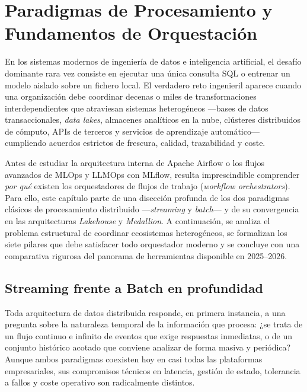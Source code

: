 
\chapter{Paradigmas de Procesamiento y Fundamentos de Orquestación}\label{chap:fundamentos}

En los sistemas modernos de ingeniería de datos e inteligencia artificial, el desafío dominante rara vez consiste en ejecutar una única consulta SQL o entrenar un modelo aislado sobre un fichero local. El verdadero reto ingenieril aparece cuando una organización debe coordinar decenas o miles de transformaciones interdependientes que atraviesan sistemas heterogéneos ---bases de datos transaccionales, \textit{data lakes}, almacenes analíticos en la nube, clústeres distribuidos de cómputo, APIs de terceros y servicios de aprendizaje automático--- cumpliendo acuerdos estrictos de frescura, calidad, trazabilidad y coste.

Antes de estudiar la arquitectura interna de Apache Airflow o los flujos avanzados de MLOps y LLMOps con MLflow, resulta imprescindible comprender \textit{por qué} existen los orquestadores de flujos de trabajo (\textit{workflow orchestrators}). Para ello, este capítulo parte de una disección profunda de los dos paradigmas clásicos de procesamiento distribuido ---\textit{streaming} y \textit{batch}--- y de su convergencia en las arquitecturas \textit{Lakehouse} y \textit{Medallion}. A continuación, se analiza el problema estructural de coordinar ecosistemas heterogéneos, se formalizan los siete pilares que debe satisfacer todo orquestador moderno y se concluye con una comparativa rigurosa del panorama de herramientas disponible en 2025--2026.

\section{Streaming frente a Batch en profundidad}\label{sec:streaming-vs-batch}

Toda arquitectura de datos distribuida responde, en primera instancia, a una pregunta sobre la naturaleza temporal de la información que procesa: ¿se trata de un flujo continuo e infinito de eventos que exige respuestas inmediatas, o de un conjunto histórico acotado que conviene analizar de forma masiva y periódica? Aunque ambos paradigmas coexisten hoy en casi todas las plataformas empresariales, sus compromisos técnicos en latencia, gestión de estado, tolerancia a fallos y coste operativo son radicalmente distintos.

